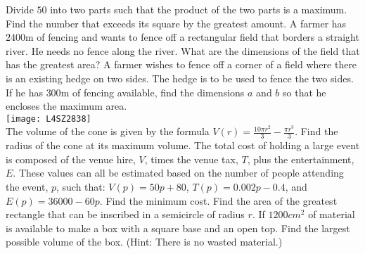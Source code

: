 \begin{Exercise}[title={Optimisation},label=exOptimisation]
	\Question Divide $50$ into two parts such that the product of the two parts is a maximum. %
	\Question Find the number that exceeds its square by the greatest amount. %
	\Question A farmer has $2400 \mbox{m}$ of fencing and wants to fence off a rectangular field that borders a straight river. He needs no fence along the river. What are the dimensions of the field that has the greatest area? %
	\Question A farmer wishes to fence off a corner of a field where there is an existing hedge on two sides. The hedge is to be used to fence the two sides. If he has $300 \mbox{m}$ of fencing available, find the dimensions $a$ and $b$ so that he encloses the maximum area.\\ 
	 \texttt{[image: L4SZ2838]}\\ %
	\Question The volume of the cone is given by the formula $V(r)= \frac{10\pi r^2}{3}-\frac{\pi r^3}{3}$. Find the radius of the cone at its maximum volume.%
	\Question The total cost of holding a large event is composed of the venue hire, $V$, times the venue tax, $T$, plus the entertainment, $E$. These values can all be estimated based on the number of people attending the event, $p$, such that: $V(p)=50p+80$, $T(p)=0.002p-0.4$, and $E(p)=36000-60p$. Find the minimum cost.%
	\Question Find the area of the greatest rectangle that can be inscribed in a semicircle	of radius $r$. %
	\Question If $1200 cm^{2}$ of material is available to make a box with a square base and an open top. Find the largest possible volume of the box. (Hint: There is no wasted material.) %

\end{Exercise}
